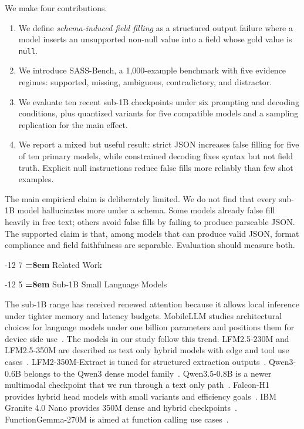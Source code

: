 \documentclass{svproc}
\makeatletter
\newcommand{\sass}{SASS-Bench\xspace}
\newcommand{\cnull}{\texttt{null}\xspace}
\renewcommand\section{\@startsection{section}{1}{\z@}%
   {-12\p@ \@plus -4\p@ \@minus -4\p@}%
   {7\p@ \@plus 4\p@ \@minus 4\p@}%
   {\normalfont\large\bfseries\boldmath
    \rightskip=\z@ \@plus 8em\pretolerance=10000 }}
\renewcommand\subsection{\@startsection{subsection}{2}{\z@}%
   {-12\p@ \@plus -4\p@ \@minus -4\p@}%
   {5\p@ \@plus 4\p@ \@minus 4\p@}%
   {\normalfont\normalsize\bfseries\boldmath
    \rightskip=\z@ \@plus 8em\pretolerance=10000 }}
\makeatother
\begin{document}
We make four contributions.
\begin{enumerate}[leftmargin=*,nosep]
    \item We define \emph{schema-induced field filling} as a structured output failure where a model inserts an unsupported non-null value into a field whose gold value is \cnull.
    \item We introduce \sass, a 1,000-example benchmark with five evidence regimes: supported, missing, ambiguous, contradictory, and distractor.
    \item We evaluate ten recent sub-1B checkpoints under six prompting and decoding conditions, plus quantized variants for five compatible models and a sampling replication for the main effect.
    \item We report a mixed but useful result: strict JSON increases false filling for five of ten primary models, while constrained decoding fixes syntax but not field truth. Explicit null instructions reduce false fills more reliably than few shot examples.
\end{enumerate}

The main empirical claim is deliberately limited. We do not find that every sub-1B model hallucinates more under a schema. Some models already false fill heavily in free text; others avoid false fills by failing to produce parseable JSON. The supported claim is that, among models that can produce valid JSON, format compliance and field faithfulness are separable. Evaluation should measure both.

\section{Related Work}

\subsection{Sub-1B Small Language Models}

The sub-1B range has received renewed attention because it allows local inference under tighter memory and latency budgets. MobileLLM studies architectural choices for language models under one billion parameters and positions them for device side use~\cite{mobilellm2024}. The models in our study follow this trend. LFM2.5-230M and LFM2.5-350M are described as text only hybrid models with edge and tool use cases~\cite{liquidlfm25}. LFM2-350M-Extract is tuned for structured extraction outputs~\cite{liquidextract}. Qwen3-0.6B belongs to the Qwen3 dense model family~\cite{qwen3tr,qwen3hf}. Qwen3.5-0.8B is a newer multimodal checkpoint that we run through a text only path~\cite{qwen35hf}. Falcon-H1 provides hybrid head models with small variants and efficiency goals~\cite{falconh1}. IBM Granite 4.0 Nano provides 350M dense and hybrid checkpoints~\cite{granite350,graniteh350}. FunctionGemma-270M is aimed at function calling use cases~\cite{functiongemma}.
\end{document}
